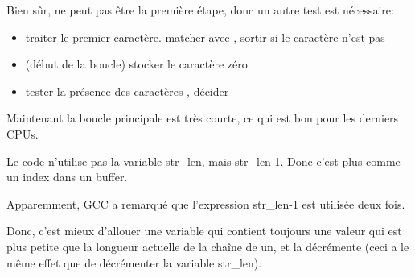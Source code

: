 Bien sûr,   ne peut pas être la première étape, donc
un autre test est nécessaire:

\begin{itemize}
\item traiter le premier caractère. matcher avec \CRLF{}, sortir si le caractère
n'est pas \CRLF{}

\item (début de la boucle) stocker le caractère zéro

\item tester la présence des caractères \CRLF{}, décider
\end{itemize}

Maintenant la boucle principale est très courte, ce qui est bon pour les derniers
\ac{CPU}s.

Le code n'utilise pas la variable str\_len, mais str\_len-1.
Donc c'est plus comme un index dans un buffer.

Apparemment, GCC a remarqué que l'expression str\_len-1 est utilisée deux fois.

Donc, c'est mieux d'allouer une variable qui contient toujours une valeur qui est
plus petite que la longueur actuelle de la chaîne de un, et la décrémente (ceci a
le même effet que de décrémenter la variable str\_len).
